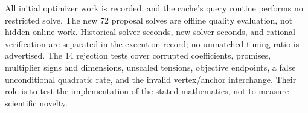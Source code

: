 All initial optimizer work is recorded, and the cache's query routine performs no restricted solve. The new 72 proposal solves are offline quality evaluation, not hidden online work. Historical solver seconds, new solver seconds, and rational verification are separated in the execution record; no unmatched timing ratio is advertised. The 14 rejection tests cover corrupted coefficients, promises, multiplier signs and dimensions, unscaled tensions, objective endpoints, a false unconditional quadratic rate, and the invalid vertex/anchor interchange. Their role is to test the implementation of the stated mathematics, not to measure scientific novelty.
